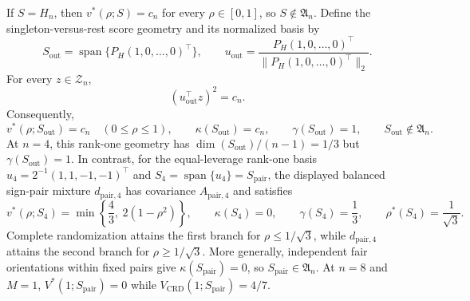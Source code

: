 If \(S=H_n\), then \(v^*(\rho;S)=c_n\) for every \(\rho\in[0,1]\), so \(S\notin\mathfrak A_n\). Define the singleton-versus-rest score geometry and its normalized basis by
\[
S_{\mathrm{out}}=\operatorname{span}\{P_H(1,0,\ldots,0)^\top\},
\qquad
u_{\mathrm{out}}=\frac{P_H(1,0,\ldots,0)^\top}{\|P_H(1,0,\ldots,0)^\top\|_2}.
\]
For every \(z\in\mathcal Z_n\),
\[
(u_{\mathrm{out}}^\top z)^2=c_n.
\]
Consequently,
\[
v^*(\rho;S_{\mathrm{out}})=c_n\quad(0\leq\rho\leq1),
\qquad
\kappa(S_{\mathrm{out}})=c_n,
\qquad
\gamma(S_{\mathrm{out}})=1,
\qquad
S_{\mathrm{out}}\notin\mathfrak A_n.
\]
At \(n=4\), this rank-one geometry has \(\dim(S_{\mathrm{out}})/(n-1)=1/3\) but \(\gamma(S_{\mathrm{out}})=1\). In contrast, for the equal-leverage rank-one basis \(u_4=2^{-1}(1,1,-1,-1)^\top\) and \(S_4=\operatorname{span}\{u_4\}=S_{\mathrm{pair}}\), the displayed balanced sign-pair mixture \(d_{\mathrm{pair},4}\) has covariance \(A_{\mathrm{pair},4}\) and satisfies
\[
v^*(\rho;S_4)=\min\left\{\frac43,\ 2(1-\rho^2)\right\},
\qquad
\kappa(S_4)=0,
\qquad
\gamma(S_4)=\frac13,
\qquad
\rho^*(S_4)=\frac1{\sqrt3}.
\]
Complete randomization attains the first branch for \(\rho\leq1/\sqrt3\), while \(d_{\mathrm{pair},4}\) attains the second branch for \(\rho\geq1/\sqrt3\). More generally, independent fair orientations within fixed pairs give \(\kappa(S_{\mathrm{pair}})=0\), so \(S_{\mathrm{pair}}\in\mathfrak A_n\). At \(n=8\) and \(M=1\), \(V^*(1;S_{\mathrm{pair}})=0\) while \(V_{\mathrm{CRD}}(1;S_{\mathrm{pair}})=4/7\).
